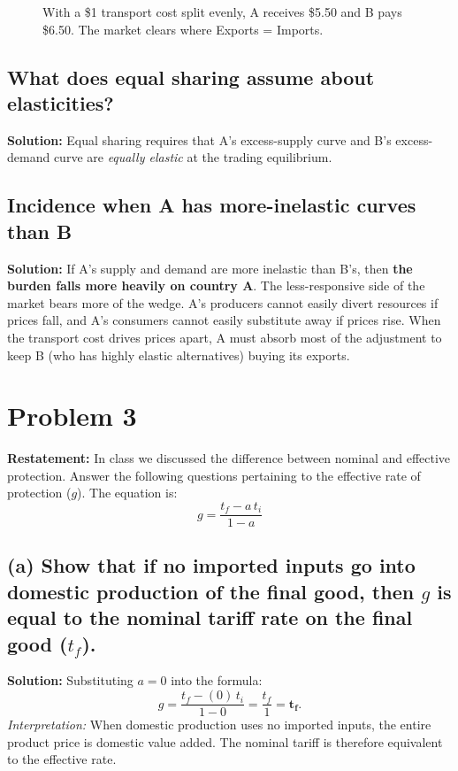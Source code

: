 \documentclass[11pt, letterpaper]{article}
\begin{document}
\begin{figure}[H]
  \caption{With a \$1 transport cost split evenly, A receives \$5.50 and B pays \$6.50. The market clears where Exports = Imports.}
\end{figure}

\subsection*{What does equal sharing assume about elasticities?}
\noindent \textbf{Solution:} Equal sharing requires that A's excess-supply curve and B's excess-demand curve are \textit{equally elastic} at the trading equilibrium.

\subsection*{Incidence when A has more-inelastic curves than B}
\noindent \textbf{Solution:} If A's supply and demand are more inelastic than B's, then \textbf{the burden falls more heavily on country A}. The less-responsive side of the market bears more of the wedge. A's producers cannot easily divert resources if prices fall, and A's consumers cannot easily substitute away if prices rise. When the transport cost drives prices apart, A must absorb most of the adjustment to keep B (who has highly elastic alternatives) buying its exports.

\vspace{1em}
\section*{Problem 3}

\textbf{Restatement:} In class we discussed the difference between nominal and effective protection. Answer the following questions pertaining to the effective rate of protection ($g$). The equation is:
\[
  g = \frac{t_f - a\, t_i}{1 - a}
\]

\subsection*{(a) Show that if no imported inputs go into domestic production of the final good, then $g$ is equal to the nominal tariff rate on the final good ($t_f$).}
\noindent \textbf{Solution:} Substituting $a = 0$ into the formula:
\[
  g = \frac{t_f - (0)\,t_i}{1 - 0} = \frac{t_f}{1} = \mathbf{t_f}.
\]
\textit{Interpretation:} When domestic production uses no imported inputs, the entire product price is domestic value added. The nominal tariff is therefore equivalent to the effective rate.
\end{document}

